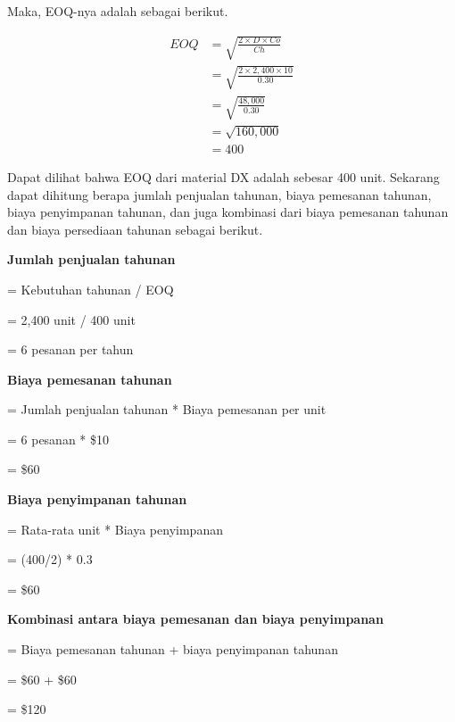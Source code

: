 Maka, EOQ-nya adalah sebagai berikut.

\begin{equation}
    \begin{split}
		EOQ
		&= \sqrt{\frac{2 \times D \times Co}{Ch}} \\
		&= \sqrt{\frac{2 \times 2,400 \times 10}{0.30}} \\
		&= \sqrt{\frac{48,000}{0.30}} \\
		&= \sqrt{160,000} \\
		&= 400
    \end{split}
\end{equation}

Dapat dilihat bahwa EOQ dari material DX adalah sebesar 400 unit. Sekarang dapat dihitung berapa jumlah penjualan tahunan, biaya pemesanan tahunan, biaya penyimpanan tahunan, dan juga kombinasi dari biaya pemesanan tahunan dan biaya persediaan tahunan sebagai berikut.

\textbf{Jumlah penjualan tahunan}

= Kebutuhan tahunan / EOQ

= 2,400 unit / 400 unit

= 6 pesanan per tahun

\textbf{Biaya pemesanan tahunan}

= Jumlah penjualan tahunan * Biaya pemesanan per unit

= 6 pesanan * \${10}

= \${60}

\textbf{Biaya penyimpanan tahunan}

= Rata-rata unit * Biaya penyimpanan

= (400/2) * 0.3

= \${60}

\textbf{Kombinasi antara biaya pemesanan dan biaya penyimpanan}

= Biaya pemesanan tahunan + biaya penyimpanan tahunan

= \${60} + \${60}

= \${120}


